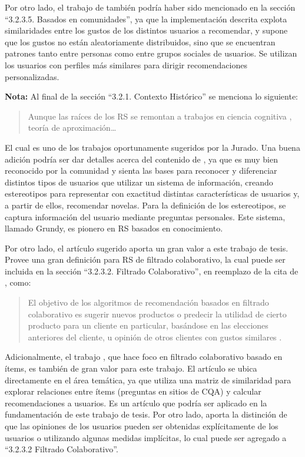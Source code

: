 \bigskip

Por otro lado, el trabajo de \cite{shardanand1995social} también podría haber sido mencionado en la sección ``3.2.3.5. Basados en comunidades'', ya que la implementación descrita explota similaridades entre los gustos de los distintos usuarios a recomendar, y supone que los gustos no están aleatoriamente distribuidos, sino que se encuentran patrones tanto entre personas como entre grupos sociales de usuarios. Se utilizan los usuarios con perfiles más similares para dirigir recomendaciones personalizadas.

\bigskip

\noindent \textbf{Nota:} Al final de la sección “3.2.1. Contexto Histórico” se menciona lo siguiente:
\begin{quotation}
	Aunque las raíces de los RS se remontan a trabajos en ciencia cognitiva \citep{rich1979user}, teoría de aproximación…
\end{quotation}

El cual es uno de los trabajos oportunamente sugeridos por la Jurado. Una buena adición podría ser dar detalles acerca del contenido de \citep{rich1979user}, ya que es muy bien reconocido por la comunidad y sienta las bases para reconocer y diferenciar distintos tipos de usuarios que utilizar un sistema de información, creando estereotipos para representar con exactitud distintas características de usuarios y, a partir de ellos, recomendar novelas. Para la definición de los estereotipos, se captura información del usuario mediante preguntas personales. Este sistema, llamado Grundy, es pionero en RS basados en conocimiento.

\bigskip

Por otro lado, el artículo sugerido \citep{sarwar2002incremental} aporta un gran valor a este trabajo de tesis. Provee una gran definición para RS de filtrado colaborativo, la cual puede ser incluida en la sección ``3.2.3.2. Filtrado Colaborativo'', en reemplazo de la cita de \citep{schafer2007collaborative}, como:
\begin{quotation}
El objetivo de los algoritmos de recomendación basados en filtrado colaborativo es sugerir nuevos productos o predecir la utilidad de cierto producto para un cliente en particular, basándose en las elecciones anteriores del cliente, u opinión de otros clientes con gustos similares \citep{sarwar2002incremental}.
\end{quotation}

Adicionalmente, el trabajo \citep{sarwar2001item}, que hace foco en filtrado colaborativo basado en ítems, es también de gran valor para este trabajo. El artículo se ubica directamente en el área temática, ya que utiliza una matriz de similaridad para explorar relaciones entre ítems (preguntas en sitios de CQA) y calcular recomendaciones a usuarios. Es un artículo que podría ser aplicado en la fundamentación de este trabajo de tesis. Por otro lado, aporta la distinción de que las opiniones de los usuarios pueden ser obtenidas explícitamente de los usuarios o utilizando algunas medidas implícitas, lo cual puede ser agregado a ``3.2.3.2 Filtrado Colaborativo''.

